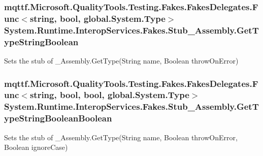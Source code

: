 \hypertarget{class_system_1_1_runtime_1_1_interop_services_1_1_fakes_1_1_stub___assembly_a0a7aa802dc1be1b4c5bf8199dd32b2f5}{
\subsubsection[{Get\-Type\-String\-Boolean}]{\setlength{\rightskip}{0pt plus 5cm}mqttf.\-Microsoft.\-Quality\-Tools.\-Testing.\-Fakes.\-Fakes\-Delegates.\-Func$<$string, bool, global.\-System.\-Type$>$ System.\-Runtime.\-Interop\-Services.\-Fakes.\-Stub\-\_\-\-Assembly.\-Get\-Type\-String\-Boolean}}\label{class_system_1_1_runtime_1_1_interop_services_1_1_fakes_1_1_stub___assembly_a0a7aa802dc1be1b4c5bf8199dd32b2f5}


Sets the stub of \-\_\-\-Assembly.\-Get\-Type(\-String name, Boolean throw\-On\-Error)

\hypertarget{class_system_1_1_runtime_1_1_interop_services_1_1_fakes_1_1_stub___assembly_a8e1594e9371401702e7c11342ad71bd2}{
\subsubsection[{Get\-Type\-String\-Boolean\-Boolean}]{\setlength{\rightskip}{0pt plus 5cm}mqttf.\-Microsoft.\-Quality\-Tools.\-Testing.\-Fakes.\-Fakes\-Delegates.\-Func$<$string, bool, bool, global.\-System.\-Type$>$ System.\-Runtime.\-Interop\-Services.\-Fakes.\-Stub\-\_\-\-Assembly.\-Get\-Type\-String\-Boolean\-Boolean}}\label{class_system_1_1_runtime_1_1_interop_services_1_1_fakes_1_1_stub___assembly_a8e1594e9371401702e7c11342ad71bd2}


Sets the stub of \-\_\-\-Assembly.\-Get\-Type(\-String name, Boolean throw\-On\-Error, Boolean ignore\-Case)

